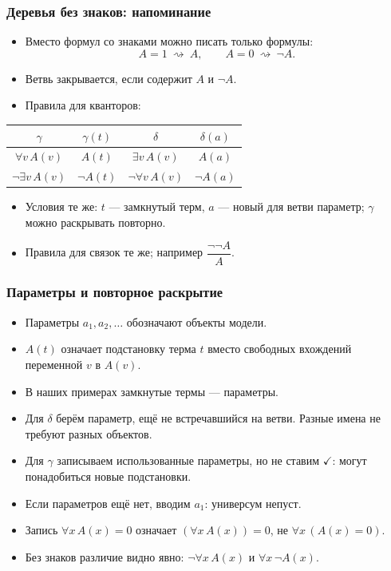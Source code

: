 \documentclass[10pt]{beamer}
\begin{document}
\begin{frame}
\frametitle{Деревья без знаков: напоминание}
\begin{itemize}
    \item Вместо формул со знаками можно писать только формулы:
    \[
        A=1\ \rightsquigarrow\ A,
        \qquad A=0\ \rightsquigarrow\ \neg A.
    \]
    \item Ветвь закрывается, если содержит $A$ и $\neg A$.
    \pause
    \item Правила для кванторов:
\end{itemize}
\begin{center}
    \begin{tabular}{|c|c||c|c|}
        \hline
        $\gamma$ & $\gamma(t)$ & $\delta$ & $\delta(a)$ \\
        \hline
        $\forall v\,A(v)$ & $A(t)$ & $\exists v\,A(v)$ & $A(a)$ \\
        $\neg\exists v\,A(v)$ & $\neg A(t)$ & $\neg\forall v\,A(v)$ & $\neg A(a)$ \\
        \hline
    \end{tabular}
\end{center}
\begin{itemize}
    \item Условия те же: $t$ --- замкнутый терм, $a$ --- новый для ветви параметр; $\gamma$ можно раскрывать повторно.
    \item Правила для связок те же; например $\dfrac{\neg\neg A}{A}$.
\end{itemize}
\end{frame}

\begin{frame}
\frametitle{Параметры и повторное раскрытие}
\begin{itemize}
    \item Параметры $a_1,a_2,\ldots$ обозначают объекты модели.
    \item $A(t)$ означает подстановку терма $t$ вместо свободных вхождений переменной $v$ в $A(v)$.
    \item В наших примерах замкнутые термы --- параметры.
    \pause
    \item Для $\delta$ берём параметр, ещё не встречавшийся на ветви. Разные имена не требуют разных объектов.
    \item Для $\gamma$ записываем использованные параметры, но не ставим $\checkmark$: могут понадобиться новые подстановки.
    \pause
    \item Если параметров ещё нет, вводим $a_1$: универсум непуст.
    \item Запись $\forall x\,A(x)=0$ означает $(\forall x\,A(x))=0$, не $\forall x\,(A(x)=0)$.
    \item Без знаков различие видно явно: $\neg\forall x\,A(x)$ и $\forall x\,\neg A(x)$.
\end{itemize}
\end{frame}
\end{document}
